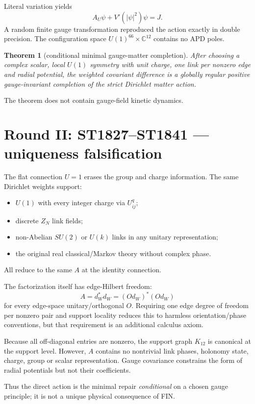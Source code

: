 \documentclass[11pt,a4paper]{article}
\newtheorem{theorem}{Theorem}\newcommand{\status}[1]{\textsf{[#1]}}
\begin{document}
Literal variation yields
\[
A_U\psi+V'(|\psi|^2)\psi=J.
\]
A random finite gauge transformation reproduced the action exactly in double
precision.  The configuration space $U(1)^{66}\times\mathbb C^{12}$ contains
no APD poles.

\begin{theorem}[conditional minimal gauge-matter completion]
After choosing a complex scalar, local $U(1)$ symmetry with unit charge, one
link per nonzero edge and radial potential, the weighted covariant difference
is a globally regular positive gauge-invariant completion of the strict
Dirichlet matter action.
\end{theorem}

The theorem does not contain gauge-field kinetic dynamics.

\section{Round II: ST1827--ST1841 --- uniqueness falsification}

The flat connection $U=1$ erases the group and charge information.  The same
Dirichlet weights support:
\begin{itemize}
\item $U(1)$ with every integer charge via $U_{ij}^q$;
\item discrete $Z_N$ link fields;
\item non-Abelian $SU(2)$ or $U(k)$ links in any unitary representation;
\item the original real classical/Markov theory without complex phase.
\end{itemize}
All reduce to the same $A$ at the identity connection.

The factorization itself has edge-Hilbert freedom:
\[
A=d_W^*d_W=(Od_W)^*(Od_W)
\]
for every edge-space unitary/orthogonal $O$.  Requiring one edge degree of
freedom per nonzero pair and support locality reduces this to harmless
orientation/phase conventions, but that requirement is an additional
calculus axiom.

Because all off-diagonal entries are nonzero, the support graph $K_{12}$ is
canonical at the support level.  However, $A$ contains no nontrivial link
phases, holonomy state, charge, group or scalar representation.  Gauge
covariance constrains the form of radial potentials but not their coefficients.

Thus the direct action is the minimal repair \emph{conditional} on a chosen
gauge principle; it is not a unique physical consequence of FIN.
\end{document}
